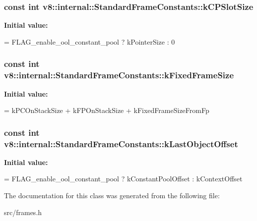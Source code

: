 \subsubsection[{k\+C\+P\+Slot\+Size}]{\setlength{\rightskip}{0pt plus 5cm}const int v8\+::internal\+::\+Standard\+Frame\+Constants\+::k\+C\+P\+Slot\+Size\hspace{0.3cm}{\ttfamily [static]}}\label{classv8_1_1internal_1_1_standard_frame_constants_accfa2178667c045c4fb86eb447c3f1e4}
{\bfseries Initial value\+:}
\begin{DoxyCode}
=
      FLAG\_enable\_ool\_constant\_pool ? kPointerSize : 0
\end{DoxyCode}
\hypertarget{classv8_1_1internal_1_1_standard_frame_constants_a325d79d2b5cfb227a048269f1d8ff35c}{}
\subsubsection[{k\+Fixed\+Frame\+Size}]{\setlength{\rightskip}{0pt plus 5cm}const int v8\+::internal\+::\+Standard\+Frame\+Constants\+::k\+Fixed\+Frame\+Size\hspace{0.3cm}{\ttfamily [static]}}\label{classv8_1_1internal_1_1_standard_frame_constants_a325d79d2b5cfb227a048269f1d8ff35c}
{\bfseries Initial value\+:}
\begin{DoxyCode}
=  kPCOnStackSize + kFPOnStackSize +
                                            kFixedFrameSizeFromFp
\end{DoxyCode}
\hypertarget{classv8_1_1internal_1_1_standard_frame_constants_ac5a79a37db7fd1835d9c2b9f47b7f744}{}
\subsubsection[{k\+Last\+Object\+Offset}]{\setlength{\rightskip}{0pt plus 5cm}const int v8\+::internal\+::\+Standard\+Frame\+Constants\+::k\+Last\+Object\+Offset\hspace{0.3cm}{\ttfamily [static]}}\label{classv8_1_1internal_1_1_standard_frame_constants_ac5a79a37db7fd1835d9c2b9f47b7f744}
{\bfseries Initial value\+:}
\begin{DoxyCode}
= FLAG\_enable\_ool\_constant\_pool ?
                                           kConstantPoolOffset : kContextOffset
\end{DoxyCode}


The documentation for this class was generated from the following file\+:\begin{DoxyCompactItemize}
\item 
src/frames.\+h\end{DoxyCompactItemize}

